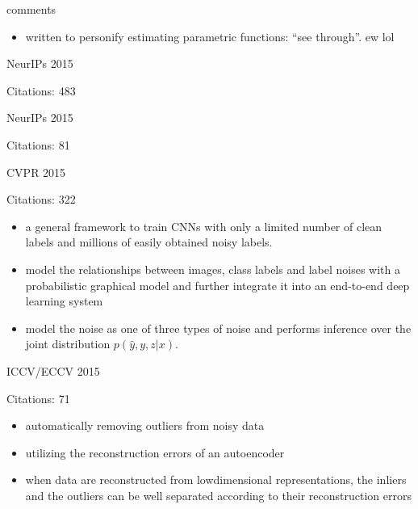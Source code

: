 \documentclass[11pt]{article}
\begin{document}
\noindent comments
\begin{itemize}
\item written to personify estimating parametric functions: ``see through''. ew lol
\end{itemize}

\vspace{2cm}

\noindent NeurIPs 2015

\noindent Citations: 483

\vspace{2cm}

\noindent NeurIPs 2015

\noindent Citations: 81

\vspace{2cm}

\noindent CVPR 2015

\noindent Citations: 322

\begin{itemize}
\item a general framework to train CNNs with only a limited number of clean labels and millions of easily obtained noisy labels.
\item  model the relationships between images, class labels and label noises with a probabilistic graphical model and further integrate it into an end-to-end deep learning system
\item model the noise as one of three types of noise and performs inference over the joint distribution $p(\hat{y},y,z | x)$.
\end{itemize}

\vspace{2cm}

\noindent ICCV/ECCV 2015

\noindent Citations: 71

\begin{itemize}
\item automatically removing outliers from noisy data
\item utilizing the reconstruction errors of an autoencoder
\item when data are reconstructed from lowdimensional representations, the inliers and the outliers can be well separated according to their reconstruction errors
\end{itemize}
\end{document}
